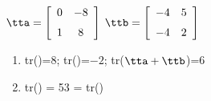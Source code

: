 {$\tta = \left[ \begin {array}{cc} 0&-8\\\noalign{\medskip}1&8\end {array}
 \right]$
 \quad
$\ttb = \left[ \begin {array}{cc} -4&5\\\noalign{\medskip}-4&2\end {array}
 \right] $
} 
{\begin{enumerate}
\item	tr(\tta)=$8$; tr(\ttb)=$-2$; tr($\tta+\ttb$)=$6$
\item	tr(\tta\ttb) = 53 = tr(\ttb\tta)
\end{enumerate}
}



  

